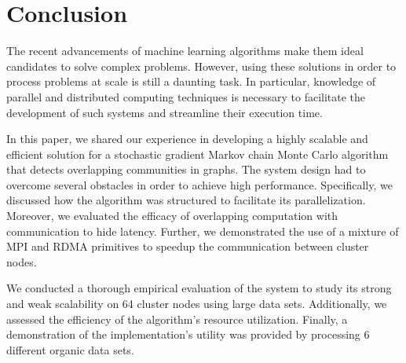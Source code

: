 \section{Conclusion}

The recent advancements of machine learning algorithms make them ideal
candidates to solve complex problems. However, using these solutions in order
to process problems at scale is still a daunting task. In particular, knowledge
of parallel and distributed computing techniques is necessary to facilitate the
development of such systems and streamline their execution time.

In this paper, we shared our experience in developing a highly scalable and
efficient solution for a stochastic gradient Markov chain Monte Carlo algorithm
that detects overlapping communities in graphs. The system design had to
overcome several obstacles in order to achieve high performance. Specifically,
we discussed how the algorithm was structured to facilitate its
parallelization. Moreover, we evaluated the efficacy of overlapping computation
with communication to hide latency.  Further, we demonstrated the use of a
mixture of MPI and RDMA primitives to speedup the communication between cluster
nodes.

We conducted a thorough empirical evaluation of the system to study its strong
and weak scalability on 64 cluster nodes using large data sets.  Additionally,
we assessed the efficiency of the algorithm's resource utilization. Finally, a
demonstration of the implementation's utility was provided by processing 6
different organic data sets.
